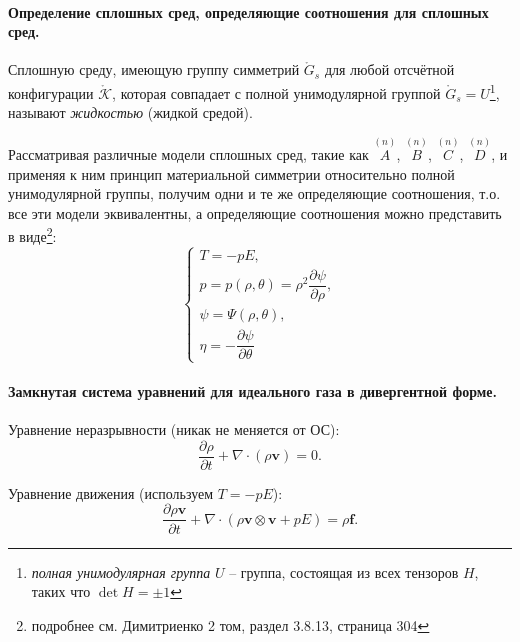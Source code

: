 
\paragraph{Определение сплошных сред, определяющие соотношения для сплошных сред.}
\begin{definition}
  Сплошную среду, имеющую группу симметрий $\mathring{G}_s$ для любой отсчётной конфигурации
  $\mathring{\mathcal{K}}$, которая совпадает с полной унимодулярной группой
  $\mathring{G}_s = U$\footnote{\emph{полная унимодулярная группа} $U$ -- группа, состоящая из всех тензоров $H$, таких что $\det H = \pm 1$},
  называют \emph{жидкостью} (жидкой средой).
\end{definition}

Рассматривая различные модели сплошных сред, такие как $\overset{(n)}{A}$,
$\overset{(n)}{B}$, $\overset{(n)}{C}$, $\overset{(n)}{D}$, и применяя к ним принцип
материальной симметрии относительно полной унимодулярной группы, получим одни и те же
определяющие соотношения, т.о. все эти модели эквивалентны, а определяющие соотношения можно
представить в виде\footnote{подробнее см. Димитриенко 2 том, раздел 3.8.13, страница 304}:
\begin{equation}\label{eq:os_fluid_1}
  \begin{cases}
    T = - p E, \\
    p = p(\rho, \theta) = \rho^2 \dfrac{\partial \psi}{\partial \rho}, \\
    \psi = \Psi(\rho, \theta), \\
    \eta = - \dfrac{\partial \psi}{\partial \theta} 
  \end{cases}
\end{equation}

\paragraph{Замкнутая система уравнений для идеального газа в дивергентной форме.}

Уравнение неразрывности (никак не меняется от ОС):
\[
  \dfrac{\partial \rho}{\partial t} + \nabla \cdot (\rho \mathbf{v}) = 0.
\]

Уравнение движения (используем $T = - p E$):
\[
  \dfrac{\partial \rho\mathbf{v}}{\partial t} + \nabla \cdot \left( \rho \mathbf{v} \otimes \mathbf{v} + p E \right) = \rho \mathbf{f}.
\]

